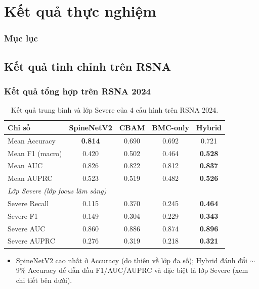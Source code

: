 \documentclass{beamer}
\numberwithin{figure}{section}
\numberwithin{table}{section}
\begin{document}
\section{Kết quả thực nghiệm}
{
    \begin{frame}
        \frametitle{Mục lục}
    \end{frame}
}

\subsection{Kết quả tinh chỉnh trên RSNA}
\begin{frame}
\frametitle{Kết quả tổng hợp trên RSNA 2024}
\begin{table}
\centering
\small
\begin{tabular}{lcccc}
\toprule
\textbf{Chỉ số} & \textbf{SpineNetV2} & \textbf{CBAM} & \textbf{BMC-only} & \textbf{Hybrid} \\
\midrule
Mean Accuracy   & \textbf{0.814} & 0.690 & 0.692 & 0.721 \\
Mean F1 (macro) & 0.420 & 0.502 & 0.464 & \textbf{0.528} \\
Mean AUC        & 0.826 & 0.822 & 0.812 & \textbf{0.837} \\
Mean AUPRC      & 0.523 & 0.519 & 0.482 & \textbf{0.526} \\
\midrule
\multicolumn{5}{l}{\textit{Lớp Severe (lớp focus lâm sàng)}} \\
Severe Recall   & 0.115 & 0.370 & 0.245 & \textbf{0.464} \\
Severe F1       & 0.149 & 0.304 & 0.229 & \textbf{0.343} \\
Severe AUC      & 0.860 & 0.886 & 0.874 & \textbf{0.896} \\
Severe AUPRC    & 0.276 & 0.319 & 0.218 & \textbf{0.321} \\
\bottomrule
\end{tabular}
\caption{Kết quả trung bình và lớp Severe của 4 cấu hình trên RSNA 2024.}
\end{table}
\begin{itemize}
    \item[$\rightarrow$] SpineNetV2 cao nhất ở Accuracy (do thiên về lớp đa số); Hybrid đánh đổi $\sim$9\% Accuracy để dẫn đầu F1/AUC/AUPRC và đặc biệt là lớp Severe (xem chi tiết bên dưới).
\end{itemize}
\end{frame}
\end{document}
